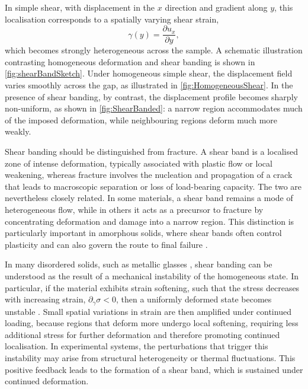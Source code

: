 In simple shear, with displacement in the $x$ direction and gradient along $y$, this localisation corresponds to a spatially varying shear strain,
\begin{equation}
    \gamma(y) = \frac{\partial u_x}{\partial y},
\end{equation}
which becomes strongly heterogeneous across the sample. A schematic illustration contrasting homogeneous deformation and shear banding is shown in \cref{fig:shearBandSketch}. Under homogeneous simple shear, the displacement field varies smoothly across the gap, as illustrated in \cref{fig:HomogeneousShear}. In the presence of shear banding, by contrast, the displacement profile becomes sharply non-uniform, as shown in \cref{fig:ShearBanded}: a narrow region accommodates much of the imposed deformation, while neighbouring regions deform much more weakly.

Shear banding should be distinguished from fracture. A shear band is a localised zone of intense deformation, typically associated with plastic flow or local weakening, whereas fracture involves the nucleation and propagation of a crack that leads to macroscopic separation or loss of load-bearing capacity. The two are nevertheless closely related. In some materials, a shear band remains a mode of heterogeneous flow, while in others it acts as a precursor to fracture by concentrating deformation and damage into a narrow region. This distinction is particularly important in amorphous solids, where shear bands often control plasticity and can also govern the route to final failure \cite{greer_shear_2013,hufnagel_deformation_2016,nicolas_deformation_2018}.

In many disordered solids, such as metallic glasses \cite{greer_shear_2013}, shear banding can be understood as the result of a mechanical instability of the homogeneous state. In particular, if the material exhibits strain softening, such that the stress decreases with increasing strain, $\partial_{\gamma}\sigma < 0$, then a uniformly deformed state becomes unstable \cite{barlow_ductile_2020}. Small spatial variations in strain are then amplified under continued loading, because regions that deform more undergo local softening, requiring less additional stress for further deformation and therefore promoting continued localisation. In experimental systems, the perturbations that trigger this instability may arise from structural heterogeneity or thermal fluctuations. This positive feedback leads to the formation of a shear band, which is sustained under continued deformation.

